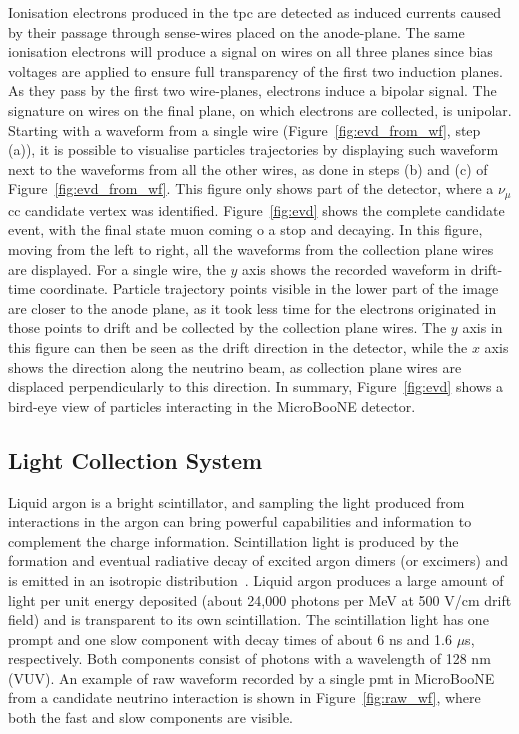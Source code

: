 Ionisation electrons produced in the \acrshort{tpc} are detected as induced currents caused by their passage through sense-wires placed on the anode-plane. The same ionisation electrons will produce a signal on wires on all three planes since bias voltages are applied to ensure full transparency of the first two induction planes. As they pass by the first two wire-planes, electrons induce a bipolar signal. The signature on wires on the final plane, on which electrons are collected, is unipolar. Starting with a waveform from a single wire (Figure~\ref{fig:evd_from_wf}, step (a)), it is possible to visualise particles trajectories by displaying such waveform next to the waveforms from all the other wires, as done in steps (b) and (c) of Figure~\ref{fig:evd_from_wf}. This figure only shows part of the detector, where a $\nu_\mu$ \acrshort{cc} candidate vertex was identified. Figure~\ref{fig:evd} shows the complete candidate event, with the final state muon coming o a stop and decaying. In this figure, moving from the left to right, all the waveforms from the collection plane wires are displayed. For a single wire, the $y$ axis shows the recorded waveform in drift-time coordinate. Particle trajectory points visible in the lower part of the image are closer to the anode plane, as it took less time for the electrons originated in those points to drift and be collected by the collection plane wires. The $y$ axis in this figure can then be seen as the drift direction in the detector, while the $x$ axis shows the direction along the neutrino beam, as collection plane wires are displaced perpendicularly to this direction. In summary, Figure~\ref{fig:evd} shows a bird-eye view of particles interacting in the MicroBooNE detector.


\subsection{Light Collection System}
\label{sec:pmt}

Liquid argon is a bright scintillator, and sampling the light produced from interactions in the argon can bring powerful capabilities and information to complement the charge information. Scintillation light is produced by the formation and eventual radiative decay of excited argon dimers (or excimers) and is emitted in an isotropic distribution~\cite{doke, kubota}. Liquid argon produces a large amount of light per unit energy deposited (about 24,000 photons per MeV at 500 V/cm drift field) and is transparent to its own scintillation. The scintillation light has one prompt and one slow component with decay times of about 6 ns and 1.6 $\mu$s, respectively. 
Both components consist of photons with a wavelength of 128 nm (VUV). An example of raw waveform recorded by a single \acrshort{pmt} in MicroBooNE from a candidate neutrino interaction is shown in Figure~\ref{fig:raw_wf}, where both the fast and slow components are visible.

